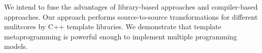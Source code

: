 We intend to fuse the advantages of library-based approaches and
compiler-based approaches. Our approach performs source-to-source
transformations for different mulitcores by C++ template libraries. We
demonstrate that template metaprogramming is powerful enough to implement multiple
programming models.





